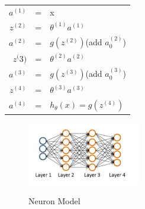\documentclass{article}
\begin{document}
\begin{table}[hb]
\begin{center}
\begin{tabular}{rcl}
$a^{(1)}$ &= &x\\
$z^{(2)}$ &= &$\theta^{(1)}a^{(1)}$\\
$a^{(2)}$ &= &$g(z^{(2)})$(add $a_{0}^{(2)}$)\\
$z^({3)}$ &= &$\theta^{(2)}a^{(2)}$\\
$a^{(3)}$ &= &$g(z^{(3)})$(add $a_{0}^{(3)}$)\\
$z^{(4)}$ &= &$\theta^{(3)}a^{(3)}$\\
$a^{(4)}$ &= &$h_{\theta}(x)=g(z^{(4)})$\\
\end{tabular}
\end{center}
\end{table}


\begin{figure}[ht]
  \centering
  \includegraphics[width=5cm]{Figure7.jpg}\\
  \caption{Neuron Model}\label{four_layer_neural_networks}
\end{figure}
\end{document}
